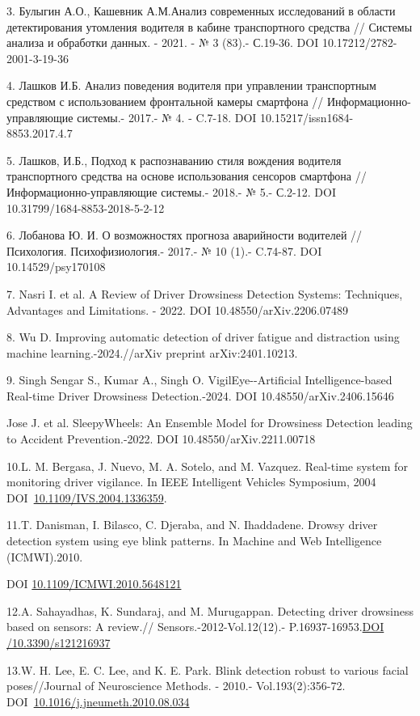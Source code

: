3. Булыгин А.О., Кашевник А.М.Анализ современных исследований в области
детектирования утомления водителя в кабине транспортного средства //
Системы анализа и обработки данных. - 2021. - № 3 (83).- С.19-36. DOI
10.17212/2782-2001-3-19-36

4. Лашков И.Б. Анализ поведения водителя при управлении транспортным
средством с использованием фронтальной камеры смартфона //
Информационно-управляющие системы.- 2017.- № 4. - C.7-18. DOI
10.15217/issn1684-8853.2017.4.7

5. Лашков, И.Б., Подход к распознаванию стиля вождения водителя
транспортного средства на основе использования сенсоров смартфона //
Информационно-управляющие системы.- 2018.- № 5.- С.2-12. DOI
10.31799/1684-8853-2018-5-2-12

6. Лобанова Ю. И. О возможностях прогноза аварийности водителей //
Психология. Психофизиология.- 2017.- № 10 (1).- C.74-87. DOI
10.14529/psy170108

7. Nasri I. et al. A Review of Driver Drowsiness Detection Systems:
Techniques, Advantages and Limitations. - 2022. DOI
10.48550/arXiv.2206.07489

8. Wu D. Improving automatic detection of driver fatigue and distraction
using machine learning.-2024.//arXiv preprint arXiv:2401.10213.

9. Singh Sengar S., Kumar A., Singh O. VigilEye-\/-Artificial
Intelligence-based Real-time Driver Drowsiness Detection.-2024. DOI
10.48550/arXiv.2406.15646

Jose J. et al. SleepyWheels: An Ensemble Model for Drowsiness Detection
leading to Accident Prevention.-2022. DOI 10.48550/arXiv.2211.00718

10.L. M. Bergasa, J. Nuevo, M. A. Sotelo, and M. Vazquez. Real-time
system for monitoring driver vigilance. In IEEE Intelligent Vehicles
Symposium, 2004
DOI~\href{https://doi.org/10.1109/IVS.2004.1336359}{10.1109/IVS.2004.1336359}.

11.T. Danisman, I. Bilasco, C. Djeraba, and N. Ihaddadene. Drowsy driver
detection system using eye blink patterns. In Machine and Web
Intelligence (ICMWI).2010.

DOI
\href{http://dx.doi.org/10.1109/ICMWI.2010.5648121}{10.1109/ICMWI.2010.5648121}

12.A. Sahayadhas, K. Sundaraj, and M. Murugappan. Detecting driver
drowsiness based on sensors: A review.// Sensors.-2012-Vol.12(12).-
P.16937-16953.\href{https://doi.org/10.3390/s121216937}{DOI
/10.3390/s121216937}

13.W. H. Lee, E. C. Lee, and K. E. Park. Blink detection robust to
various facial poses//Journal of Neuroscience Methods. - 2010.-
Vol.193(2):356-72.
DOI~\href{https://doi.org/10.1016/j.jneumeth.2010.08.034}{10.1016/j.jneumeth.2010.08.034}

